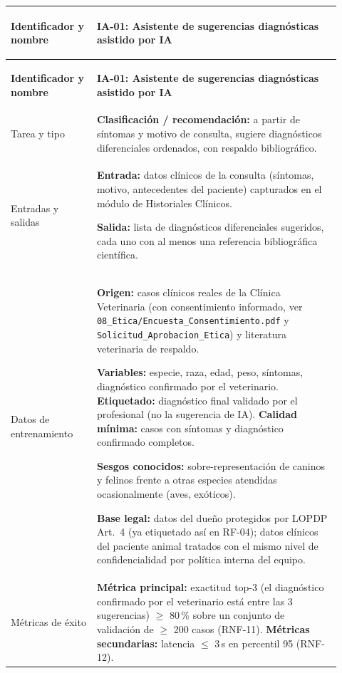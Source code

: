\begin{longtable}{@{}>{\bfseries\raggedright\arraybackslash}p{0.24\linewidth} >{\raggedright\arraybackslash}p{0.68\linewidth}@{}}
\toprule
\textbf{Identificador y nombre} & \textbf{IA-01: Asistente de sugerencias diagnósticas asistido por IA} \\
\midrule
\endfirsthead
\toprule
\textbf{Identificador y nombre} & \textbf{IA-01: Asistente de sugerencias diagnósticas asistido por IA} \\
\midrule
\endhead
\bottomrule
\endfoot
\bottomrule
\endlastfoot

Tarea y tipo & \textbf{Clasificación / recomendación:} a partir de síntomas y motivo de consulta, sugiere diagnósticos diferenciales ordenados, con respaldo bibliográfico. \\[4pt]

Entradas y salidas & \textbf{Entrada:} datos clínicos de la consulta (síntomas, motivo, antecedentes del paciente) capturados en el módulo de Historiales Clínicos.

\textbf{Salida:} lista de diagnósticos diferenciales sugeridos, cada uno con al menos una referencia bibliográfica científica. \\[4pt]

Datos de entrenamiento & \textbf{Origen:} casos clínicos reales de la Clínica Veterinaria (con consentimiento informado, ver \texttt{08\_Etica/Encuesta\_Consentimiento.pdf} y \texttt{Solicitud\_Aprobacion\_Etica}) y literatura veterinaria de respaldo.

\textbf{Variables:} especie, raza, edad, peso, síntomas, diagnóstico confirmado por el veterinario. \textbf{Etiquetado:} diagnóstico final validado por el profesional (no la sugerencia de IA). \textbf{Calidad mínima:} casos con síntomas y diagnóstico confirmado completos.

\textbf{Sesgos conocidos:} sobre-representación de caninos y felinos frente a otras especies atendidas ocasionalmente (aves, exóticos).

\textbf{Base legal:} datos del dueño protegidos por LOPDP Art.\ 4 (ya etiquetado así en RF-04); datos clínicos del paciente animal tratados con el mismo nivel de confidencialidad por política interna del equipo. \\[4pt]

Métricas de éxito & \textbf{Métrica principal:} exactitud top-3 (el diagnóstico confirmado por el veterinario está entre las 3 sugerencias) $\geq$ 80\,\% sobre un conjunto de validación de $\geq$ 200 casos (RNF-11). \textbf{Métricas secundarias:} latencia $\leq$ 3\,s en percentil 95 (RNF-12).


\end{longtable}

